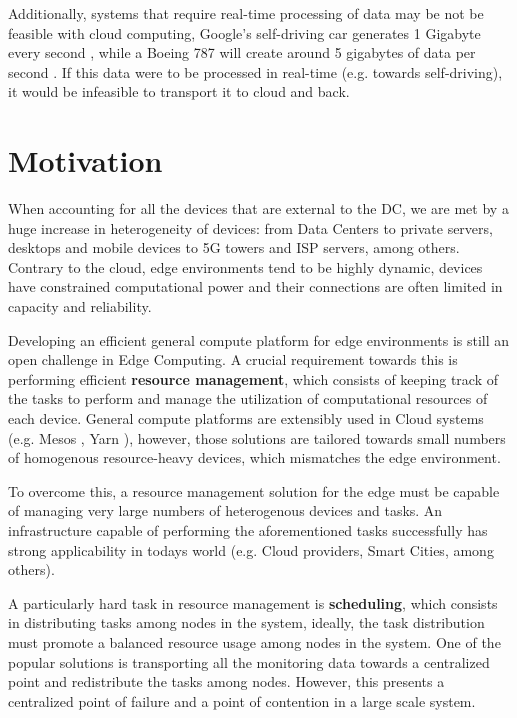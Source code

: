 Additionally, systems that require real-time processing of data may be not be feasible with cloud computing, Google's self-driving car generates 1 Gigabyte every second \cite{datafloq}, while a Boeing 787 will create around 5 gigabytes of data per second \cite{finnegan_2013}. If this data were to be processed in real-time (e.g. towards self-driving), it would be infeasible to transport it to cloud and back. 

\section{Motivation}

When accounting for all the devices that are external to the DC, we are met by a huge increase in heterogeneity of devices: from Data Centers to private servers, desktops and mobile devices to 5G towers and ISP servers, among others.  Contrary to the cloud, edge environments tend to be highly dynamic, devices have constrained computational power and their connections are often limited in capacity and reliability. 

Developing an efficient general compute platform for edge environments is still an open challenge in Edge Computing. A crucial requirement towards this is performing efficient \textbf{resource management}, which consists of keeping track of the tasks to perform and manage the utilization of computational resources of each device. General compute platforms are extensibly used in Cloud systems (e.g. Mesos \cite{hindman2011mesos}, Yarn \cite{Vavilapalli2013ApacheHY}), however, those solutions are tailored towards small numbers of homogenous resource-heavy devices, which mismatches the edge environment.

To overcome this, a resource management solution for the edge must be capable of managing very large numbers of heterogenous devices and tasks. An infrastructure capable of performing the aforementioned tasks successfully has strong applicability in todays world (e.g. Cloud providers, Smart Cities, among others). 

A particularly hard task in resource management is \textbf{scheduling}, which consists in distributing tasks among nodes in the system, ideally, the task distribution must promote a balanced resource usage among nodes in the system. One of the popular solutions is transporting all the monitoring data towards a centralized point and redistribute the tasks among nodes. However, this presents a centralized point of failure and a point of contention in a large scale system. 

